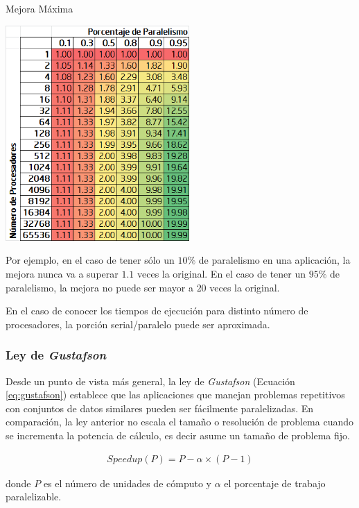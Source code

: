 \documentclass[a4paper]{report}
\begin{document}
\begin{table}[H]
\caption{Mejora Máxima}
\centering
\includegraphics[width=7cm]{amdahl.png}

\label{fig:amdahl}
\end{table}

Por ejemplo, en el caso de tener sólo un $ 10\% $ de paralelismo
en una aplicación, la mejora nunca va a superar $ 1.1 $ veces la original.
En el caso de tener un $ 95\% $ de paralelismo, la mejora no puede ser mayor a $ 20 $ veces la original.

\bigskip

En el caso de conocer los tiempos de ejecución para distinto número de procesadores, la porción serial/paralelo puede ser aproximada.

\subsubsection{Ley de {\it Gustafson}}

Desde un punto de vista más general, la ley de {\it Gustafson}
\cite{gustafson} (Ecuación \ref{eq:gustafson})
establece que las aplicaciones que manejan problemas
repetitivos con conjuntos de datos similares pueden ser fácilmente
paralelizadas. En comparación, la ley anterior no escala el tamaño o
resolución de problema cuando se incrementa la potencia de cálculo, es
decir asume un tamaño de problema fijo. 

\begin{eqnarray}
\label{eq:gustafson}
Speedup(P) = P - \alpha \times ( P - 1)
\end{eqnarray}

donde $ P $ es el número de unidades de cómputo y $ \alpha $ el porcentaje de trabajo paralelizable.
\end{document}
